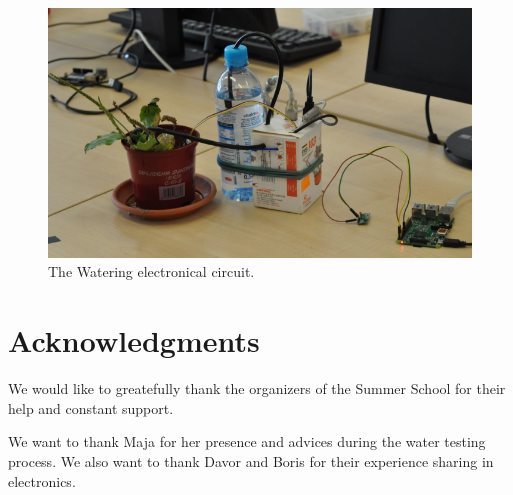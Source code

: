 \documentclass[conference]{IEEEtran}
\begin{document}
\begin{figure}
    \centering
    \includegraphics[width=\columnwidth]{final_box}
    \caption{The Watering electronical circuit.}
    \label{fig:final_box}
\end{figure}
\section*{Acknowledgments}


We would like to greatefully thank the organizers of the Summer School for their help and constant support.


We want to thank Maja for her presence and advices during the water testing process.
We also want to thank Davor and Boris for their experience sharing in electronics.



\begin{thebibliography}{10}
    \bibitem{}
\end{thebibliography}
\end{document}
